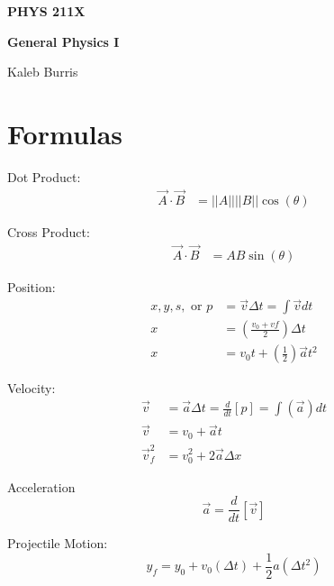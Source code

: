 \documentclass[10pt, letterpaper]{book}
\begin{document}
    \begin{titlepage}
        \Huge \textbf{PHYS 211X}

        \huge \textbf{General Physics I}

        \vfill

        \Large Kaleb Burris
    \end{titlepage}

    \section*{Formulas}

    \begin{multicols*}{2}

        Dot Product:
        \begin{align}
            \vec{A}\cdot\vec{B} & = ||A|| ||B||\cos(\theta)
        \end{align}

        Cross Product:
        \begin{align}
            \vec{A}\cdot\vec{B} & = AB\sin(\theta)
        \end{align}

        Position:
        \begin{align}
            x, y, s, \text{ or } p  & = \vec{v}\Delta t = \int\vec{v}dt                     \\
                                 x  & = \left(\frac{v_{0}+v{f}}{2}\right)\Delta t           \\
                                 x  & = v_{0} t+\left(\frac{1}{2}\right)\vec{a} t^{2}       
        \end{align}

        Velocity:
        \begin{align}
            \vec{v}         & = \vec{a}\Delta t = \frac{d}{dt}[p] = \int(\vec{a})dt     \\
            \vec{v}         & = v_{0} + \vec{a}t                                        \\
            \vec{v}^{2}_{f} & = v^{2}_{0} + 2\vec{a}\Delta x                            
        \end{align}

        Acceleration
        \begin{equation}
            \vec{a} = \frac{d}{dt}[\vec{v}]
        \end{equation}

        Projectile Motion:
        \begin{equation}
            \label{eqn::yfinal}
            y_{f} = y_{0} + v_{0}(\Delta t) + \frac{1}{2}a(\Delta t^{2})
        \end{equation}


\end{multicols*}
\end{document}
